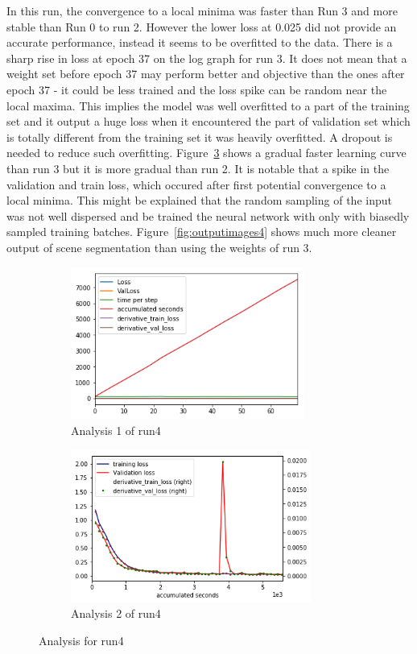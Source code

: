 \documentclass[paper=a4, fontsize=11pt]{scrartcl} %
\numberwithin{equation}{section} %
\numberwithin{figure}{section} %
\numberwithin{table}{section} %
\begin{document}
In this run, the convergence to a local minima was faster than Run 3 and more stable than Run 0 to run 2. However the lower loss at 0.025 did not provide an accurate performance, instead it seems to be overfitted to the data. There is a sharp rise in loss at epoch 37 on the log graph for run 3. It does not mean that a weight set before epoch 37 may perform better and objective than the ones after epoch 37 - it could be less trained and the loss spike can be random near the local maxima. This implies the model was well overfitted to a part of the training set and it output a huge loss when it encountered the part of validation set which is totally different from the training set it was heavily overfitted. A dropout is needed to reduce such overfitting.
Figure~\ref{fig:AnalysisRun4} shows a gradual faster learning curve than run 3 but it is more gradual than run 2. It is notable that a spike in the validation and train loss, which occured after first potential convergence to a local minima. This might be explained that the random sampling of the input was not well dispersed and be trained the neural network with only with biasedly sampled training batches. Figure~\ref{fig:outputimages4} shows much more cleaner output of scene segmentation than using the weights of run 3.
\begin{figure}	
	\begin{subfigure}{0.45\textwidth}
	\includegraphics[width=0.9\linewidth, height=5cm]{./imgs/analysis_0_4.png} 
	\caption{Analysis 1 of run4}
	\label{fig:subAnalysisRun4}
	\end{subfigure}
	\begin{subfigure}{0.45\textwidth}
	\includegraphics[width=0.9\linewidth, height=5cm]{./imgs/analysis_4plot.png}
	\caption{Analysis 2 of run4}
	\label{fig:subAnalysisRun4plot}
	\end{subfigure}
	 
	\caption{Analysis for run4}
	\label{fig:AnalysisRun4}
 \end{figure}
\end{document}
